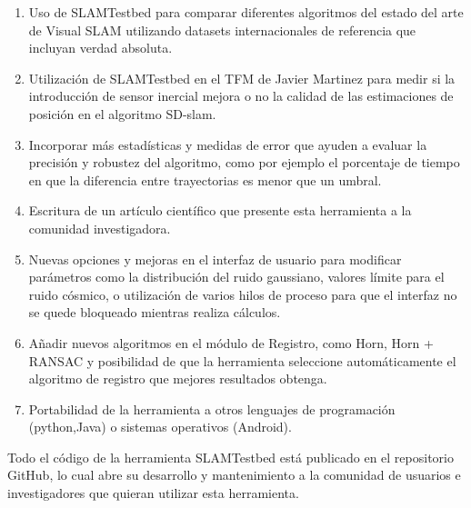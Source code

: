 \begin{enumerate}

\item{Uso de SLAMTestbed para comparar diferentes algoritmos del estado del arte de Visual SLAM utilizando datasets internacionales de referencia que incluyan verdad absoluta.}

\item{Utilización de SLAMTestbed en el TFM de Javier Martinez para medir si la introducción de sensor inercial mejora o no la calidad de las estimaciones de posición en el algoritmo SD-slam.}

\item{Incorporar más estadísticas y medidas de error que ayuden a evaluar la precisión y robustez del algoritmo, como por ejemplo el porcentaje de tiempo en que la diferencia entre trayectorias es menor que un umbral.}

\item{Escritura de un artículo científico que presente esta herramienta a la comunidad investigadora.}

\item{Nuevas opciones y mejoras en el interfaz de usuario para modificar parámetros como la distribución del ruido gaussiano, valores límite para el ruido cósmico, o utilización de varios hilos de proceso para que el interfaz no se quede bloqueado mientras realiza cálculos.}

\item{Añadir nuevos algoritmos en el módulo de Registro, como Horn, Horn + RANSAC y posibilidad de que la herramienta seleccione automáticamente el algoritmo de registro que 
mejores resultados obtenga.}

\item{Portabilidad de la herramienta a otros lenguajes de programación (python,Java) o sistemas operativos (Android).}

\end{enumerate}

Todo el código de la herramienta SLAMTestbed está publicado en el repositorio GitHub, lo cual abre su desarrollo y mantenimiento a la comunidad de usuarios e investigadores que quieran utilizar esta herramienta.


